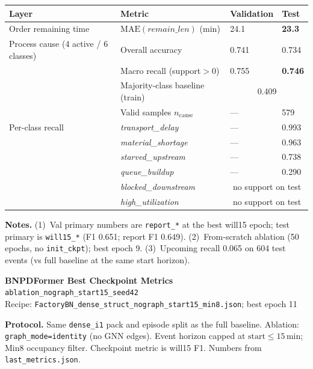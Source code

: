 \documentclass[10pt,a4paper]{article}
\begin{document}
\begin{center}
\begin{tabular}{l l l l}
\toprule
Layer & Metric & Validation & Test \\
\midrule
Order remaining time
  & $\mathrm{MAE}(\textit{remain\_len})$ (min)
  & 24.1
  & \textbf{23.3} \\
\midrule
Process cause (4 active / 6 classes)
  & Overall accuracy
  & 0.741
  & 0.734 \\
  & Macro recall (support${>}0$)
  & 0.755
  & \textbf{0.746} \\
  & Majority-class baseline (train)
  & \multicolumn{2}{c}{0.409} \\
  & Valid samples $n_{\mathrm{cause}}$
  & ---
  & 579 \\
\midrule
Per-class recall
  & \textit{transport\_delay}
  & --- & 0.993 \\
  & \textit{material\_shortage}
  & --- & 0.963 \\
  & \textit{starved\_upstream}
  & --- & 0.738 \\
  & \textit{queue\_buildup}
  & --- & 0.290 \\
  & \textit{blocked\_downstream}
  & \multicolumn{2}{c}{no support on test} \\
  & \textit{high\_utilization}
  & \multicolumn{2}{c}{no support on test} \\
\bottomrule
\end{tabular}
\end{center}

\small
\textbf{Notes.}
(1)~Val primary numbers are \texttt{report\_*} at the best will15 epoch; test primary is \texttt{will15\_*} (F1 0.651; report F1 0.649).
(2)~From-scratch ablation (50 epochs, no \texttt{init\_ckpt}); best epoch 9.
(3)~Upcoming recall 0.065 on 604 test events (vs full baseline at the same start horizon).

\clearpage
\begin{center}
{\LARGE\bfseries BNPDFormer Best Checkpoint Metrics}\\[3pt]
{\large\texttt{ablation\_nograph\_start15\_seed42}}\\[2pt]
{\normalsize Recipe: \texttt{FactoryBN\_dense\_struct\_nograph\_start15\_min8.json}; best epoch 11}
\end{center}

\textbf{Protocol.}
Same \texttt{dense\_i1} pack and episode split as the full baseline.
Ablation: \texttt{graph\_mode=identity} (no GNN edges).
Event horizon capped at $\mathrm{start}\le 15$\,min; Min8 occupancy filter.
Checkpoint metric is will15 F1.
Numbers from \texttt{last\_metrics.json}.
\end{document}
